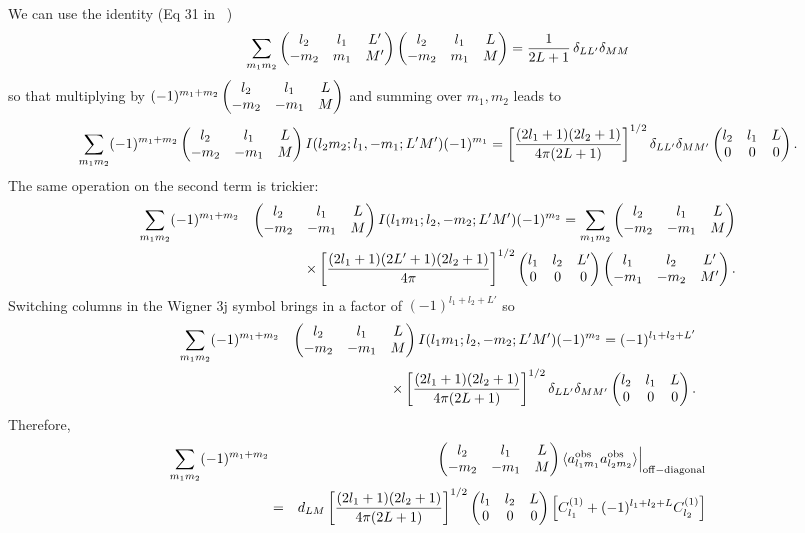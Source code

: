 \documentclass[prl,amsmath,amssymb,floatfix,superscriptaddress,nofootinbib,twocolumn]{revtex4-1}
\def\be{\begin{equation}}
\def\ee{\end{equation}}
\def\bea{\begin{eqnarray}}
\def\eea{\end{eqnarray}}
\newcommand{\vs}{\nonumber\\}
\begin{document}
We can use the identity (Eq 31 in ~\cite{Okamoto:2003zw})
\be
\sum_{m_1m_2} 
 \left(\begin{matrix} l_2 & l_1 &L'\cr -m_2&m_1&M'\end{matrix}\right)
 \left(\begin{matrix} l_2 & l_1 &L\cr -m_2&m_1&M\end{matrix}\right)
=\frac{1}{2L+1}\,\delta_{LL'}\delta_{MM}
\ee
so that multiplying by $(-1)^{m_1+m_2} \left(\begin{matrix} l_2 & l_1 &L\cr -m_2&-m_1&M\end{matrix}\right)$ and summing over $m_1,m_2$ leads to
\be
\sum_{m_1m_2}  (-1)^{m_1+m_2} \left(\begin{matrix} l_2 & l_1 &L\cr -m_2&-m_1&M\end{matrix}\right) 
I(l_2m_2;l_1,-m_1;L'M')
 (-1)^{m_1} 
= \left[
\frac{(2l_1+1)(2l_2+1)}{4\pi (2L+1)}\right]^{1/2}\delta_{LL'}\delta_{MM'}\left(\begin{matrix} l_2 & l_1 &L\cr 0&0&0\end{matrix}\right)
.\ee
The same operation on the second term is trickier:
\bea
\sum_{m_1m_2}  (-1)^{m_1+m_2} &&\left(\begin{matrix} l_2 & l_1 &L\cr -m_2&-m_1&M\end{matrix}\right) 
I(l_1m_1;l_2,-m_2;L'M')
 (-1)^{m_2}
 =
 \sum_{m_1m_2}   \left(\begin{matrix} l_2 & l_1 &L\cr -m_2&-m_1&M\end{matrix}\right) 
 \vs
 &&\times\left[ \frac{(2l_1+1)(2L'+1)(2l_2+1)}{4\pi}\right]^{1/2}\left(\begin{matrix} l_1 & l_2 &L'\cr 0&0&0\end{matrix}\right) 
 \left(\begin{matrix} l_1 & l_2 &L'\cr -m_1&-m_2&M'\end{matrix}\right).
 \eea
Switching columns in the Wigner 3j symbol brings in a factor of $(-1)^{l_1+l_2+L'}$ so
\bea
\sum_{m_1m_2}  (-1)^{m_1+m_2} &&\left(\begin{matrix} l_2 & l_1 &L\cr -m_2&-m_1&M\end{matrix}\right) 
I(l_1m_1;l_2,-m_2;L'M')
 (-1)^{m_2}
 =
 (-1)^{l_1+l_2+L'}  
 \vs
 &&\times\left[
\frac{(2l_1+1)(2l_2+1)}{4\pi (2L+1)}\right]^{1/2}\delta_{LL'}\delta_{MM'}\left(\begin{matrix} l_2 & l_1 &L\cr 0&0&0\end{matrix}\right).
 \eea
Therefore,
\bea
\sum_{m_1m_2}  (-1)^{m_1+m_2} &&\left(\begin{matrix} l_2 & l_1 &L\cr -m_2&-m_1&M\end{matrix}\right)
\langle a^{\rm obs}_{l_1m_1} a^{\rm obs}_{l_2m_2} \rangle\Big\vert_{\rm off-diagonal}
\vs
&=& d_{LM} \left[ \frac{(2l_1+1)(2l_2+1)}{4\pi(2L+1)}\right]^{1/2}\left(\begin{matrix} l_1 & l_2 &L\cr 0&0&0\end{matrix}\right)
\left[ C^{(1)}_{l_1} + (-1)^{l_1+l_2+L}C^{(1)}_{l_2}\right]
\eea
\end{document}

